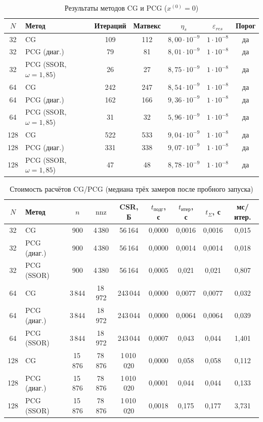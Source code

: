 \documentclass[12pt]{article}
\begin{document}
\begin{table}[H]
\centering
\caption{Результаты методов CG и PCG ($x^{(0)}=0$)}
\label{tab:krylov}
\small
\begin{tabular}{|c|l|c|c|c|c|c|}
\hline
$N$ & Метод & Итераций & Матвекс & $\eta_s$ & $\varepsilon_{res}$ & Порог \\
\hline
32 & CG & 109 & 112 & $8{,}00\cdot10^{-9}$ & $1\cdot10^{-8}$ & да \\
32 & PCG (диаг.) & 79 & 81 & $8{,}01\cdot10^{-9}$ & $1\cdot10^{-8}$ & да \\
32 & PCG (SSOR, $\omega=1{,}85$) & 26 & 27 & $8{,}75\cdot10^{-9}$ & $1\cdot10^{-8}$ & да \\
64 & CG & 242 & 247 & $8{,}54\cdot10^{-9}$ & $1\cdot10^{-8}$ & да \\
64 & PCG (диаг.) & 162 & 166 & $9{,}36\cdot10^{-9}$ & $1\cdot10^{-8}$ & да \\
64 & PCG (SSOR, $\omega=1{,}85$) & 31 & 32 & $5{,}96\cdot10^{-9}$ & $1\cdot10^{-8}$ & да \\
128 & CG & 522 & 533 & $9{,}04\cdot10^{-9}$ & $1\cdot10^{-8}$ & да \\
128 & PCG (диаг.) & 331 & 338 & $9{,}07\cdot10^{-9}$ & $1\cdot10^{-8}$ & да \\
128 & PCG (SSOR, $\omega=1{,}85$) & 47 & 48 & $8{,}78\cdot10^{-9}$ & $1\cdot10^{-8}$ & да \\
\hline
\end{tabular}
\end{table}

\begin{table}[H]
\centering
\caption{Стоимость расчётов CG/PCG (медиана трёх замеров после пробного запуска)}
\label{tab:cost}
\footnotesize
\begin{tabular}{|c|l|c|c|c|c|c|c|c|}
\hline
$N$ & Метод & $n$ & $\mathrm{nnz}$ & CSR, Б & $t_{\text{подг}}$, с & $t_{\text{итер}}$, с & $t_{\Sigma}$, с & мс/итер. \\
\hline
32 & CG & 900 & 4\,380 & 56\,164 & 0,0000 & 0,0016 & 0,0016 & 0,015 \\
32 & PCG (диаг.) & 900 & 4\,380 & 56\,164 & 0,0000 & 0,0014 & 0,0014 & 0,018 \\
32 & PCG (SSOR) & 900 & 4\,380 & 56\,164 & 0,0005 & 0,021 & 0,021 & 0,807 \\
64 & CG & 3\,844 & 18\,972 & 243\,044 & 0,0000 & 0,0077 & 0,0077 & 0,032 \\
64 & PCG (диаг.) & 3\,844 & 18\,972 & 243\,044 & 0,0000 & 0,0064 & 0,0064 & 0,039 \\
64 & PCG (SSOR) & 3\,844 & 18\,972 & 243\,044 & 0,0007 & 0,043 & 0,044 & 1,401 \\
128 & CG & 15\,876 & 78\,876 & 1\,010\,020 & 0,0000 & 0,058 & 0,058 & 0,112 \\
128 & PCG (диаг.) & 15\,876 & 78\,876 & 1\,010\,020 & 0,0001 & 0,044 & 0,044 & 0,133 \\
128 & PCG (SSOR) & 15\,876 & 78\,876 & 1\,010\,020 & 0,0018 & 0,175 & 0,177 & 3,731 \\
\hline
\end{tabular}
\end{table}
\end{document}
